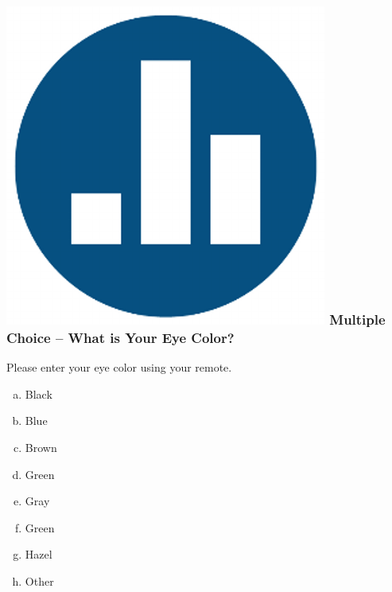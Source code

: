 \begin{frame}
\frametitle{\includegraphics[scale = 0.05]{./images/clicker} \hfill  Multiple Choice -- What is Your Eye Color?}
Please enter your eye color using your remote.
\begin{enumerate}[(a)]
  \item Black
  \item Blue
  \item Brown
  \item Green
  \item Gray
  \item Green
  \item Hazel
  \item Other
\end{enumerate}

\end{frame}


